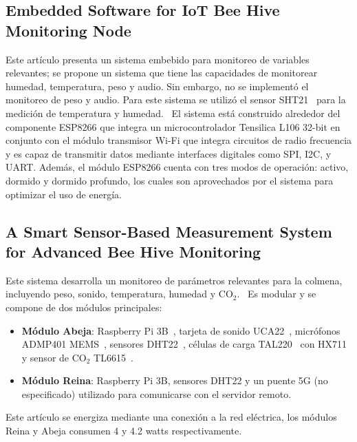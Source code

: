 \subsection{Embedded Software for IoT Bee Hive Monitoring Node}
Este artículo presenta un sistema embebido para monitoreo de variables relevantes; se propone un sistema que tiene las capacidades de monitorear humedad, temperatura, peso y audio. Sin embargo, no se implementó el monitoreo de peso y audio. Para este sistema se utilizó el sensor SHT21~\cite{sht21} para la medición de temperatura y humedad.~\cite{vidrascu_svasta_2017a}  
El sistema está construido alrededor del componente ESP8266 que integra un microcontrolador Tensilica L106 32-bit en conjunto con el módulo transmisor Wi-Fi que integra circuitos de radio frecuencia y es capaz de transmitir datos mediante interfaces digitales como SPI, I2C, y UART. Además, el módulo ESP8266 cuenta con tres modos de operación: activo, dormido y dormido profundo, los cuales son aprovechados por el sistema para optimizar el uso de energía.~\cite{vidrascu_svasta_2017a}

\subsection{A Smart Sensor-Based Measurement System for Advanced Bee Hive Monitoring}
Este sistema desarrolla un monitoreo de parámetros relevantes para la colmena, incluyendo peso, sonido, temperatura, humedad y CO$_2$.~\cite{cecchi_spinsante_terenzi_orcioni_2020}  
Es modular y se compone de dos módulos principales:  
\begin{itemize}
    \item \textbf{Módulo Abeja}: Raspberry Pi 3B~\cite{buy_raspberry_pi3_model_b}, tarjeta de sonido UCA22~\cite{behringer_uca222}, micrófonos ADMP401 MEMS~\cite{admp401_datasheet}, sensores DHT22~\cite{liu}, células de carga TAL220~\cite{loadcell_tal220_sparkfun} con HX711~\cite{hx711_sparkfun} y sensor de CO$_2$ TL6615~\cite{t6615_telaire}.
    \item \textbf{Módulo Reina}: Raspberry Pi 3B, sensores DHT22 y un puente 5G (no especificado) utilizado para comunicarse con el servidor remoto.~\cite{cecchi_spinsante_terenzi_orcioni_2020}
\end{itemize}  
Este artículo se energiza mediante una conexión a la red eléctrica, los módulos Reina y Abeja consumen 4 y 4.2 watts respectivamente.~\cite{cecchi_spinsante_terenzi_orcioni_2020}

